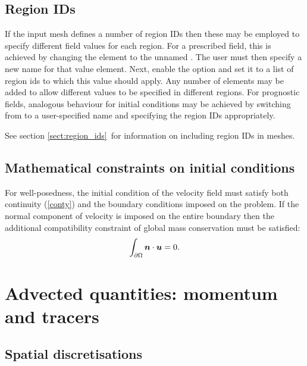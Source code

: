 \subsection{Region IDs}
If the input mesh defines a number of region IDs then these may be employed
to specify different field values for each region. For a prescribed field,
this is achieved by changing the  element to
the unnamed . The user must then specify a new name for
that value element. Next, enable the  
option and set it to a list of region ids to which this value should
apply. Any number of   elements may be added to allow
different values to be specified in different regions. For prognostic
fields, analogous behaviour for initial conditions may be achieved by
switching  from  to a
user-specified name and specifying the region IDs appropriately.

See section \ref{sect:region_ids}\ for information on including region IDs
in meshes.

\subsection{Mathematical constraints on initial conditions}\label{Sect:ICs}

For well-posedness, the initial condition of the velocity field must
satisfy both continuity (\ref{conty}) and the boundary conditions
imposed on the problem. If the normal component of velocity is
imposed on the entire boundary then the additional
compatibility constraint of global mass conservation must be
satisfied:
\begin{equation*}
\int_{\partial\Omega}{\mbox{\boldmath$n$}}\cdot{\mbox{\boldmath$u$}}=0.
\end{equation*}

\section{Advected quantities: momentum and tracers}
\label{config:spatial}

\subsection{Spatial discretisations}\label{Sect:Spatial discretisations}

